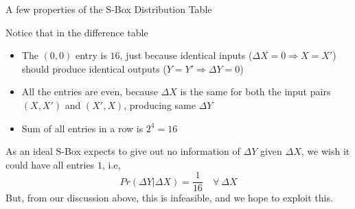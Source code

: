 \documentclass[9pt]{beamer}
\begin{document}
\begin{frame}
A few properties of the S-Box Distribution Table

\vspace{5mm}
\pause Notice that in the difference table
\begin{itemize}[<+->]
\item{The $(0,0)$ entry is $16$, just because identical inputs ($\Delta X = 0 \Rightarrow X = X'$) should produce identical outputs ($Y = Y' \Rightarrow \Delta Y = 0$)}
\item{All the entries are even, because $\Delta X$ is the same for both the input pairs $(X,X')$ and $(X',X)$, producing same $\Delta Y$}
\item{Sum of all entries in a row is $2^4 = 16$}
\end{itemize}

\vspace{5mm}
\pause As an ideal S-Box expects to give out no information of $\Delta Y$ given $\Delta X$, we wish it could have all entries $1$, i.e,
\[ Pr(\Delta Y | \Delta X) = \frac{1}{16} \quad \forall \: \Delta X  \]
\pause But, from our discussion above, this is infeasible, and we hope to exploit this.
\end{frame}
\end{document}
